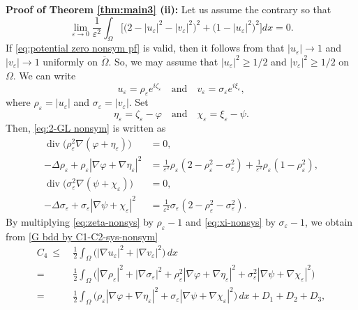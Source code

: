 \documentclass[a4paper,10pt,reqno]{amsart}
\theoremstyle{definition}
\newcommand{\ve}{{\varepsilon}}
\newcommand{\Om}{{\Omega}}
\newcommand{\qand}{{\quad \mbox{and} \quad}}
\numberwithin{equation}{section}
\begin{document}
 \smallskip
{\bf Proof of Theorem \ref{thm:main3} (ii): }
Let us assume the contrary so that
\begin{equation}\label{eq:potential zero nonsym pf}
\lim_{\ve \to 0} \frac{1}{\ve^2}  \int_\Om  \Big[ \big( 2- |u_\ve|^2 - |v_\ve|^2 \big)^2 +    \big( 1- |u_\ve|^2   \big)^2 \Big] dx = 0.
\end{equation}
If \eqref{eq:potential zero nonsym pf} is valid, then it follows from \cite[Lemma 2.5]{HHS-nonsym-deg-0} that $|u_\ve|\to 1$ and $|v_\ve|\to 1$ uniformly on $\overline\Om$.
So, we may assume that $|u_\ve|^2 \ge 1/2$ and $|v_\ve|^2 \ge 1/2$ on $\Om$.
We can write
\begin{equation}\label{eq:zeta xi}
 u_\varepsilon = \rho_\varepsilon e^{i \zeta_\varepsilon} \qand
v_\varepsilon = \sigma_\varepsilon e^{i \xi_\varepsilon},
\end{equation}
where $\rho_\ve = |u_\ve|$ and $\sigma_\ve = |v_\ve|$.
Set
\begin{equation}\label{eq:eta chi}
\eta_\varepsilon = \zeta_\varepsilon   -\varphi \qand \chi_\varepsilon = \xi_\varepsilon - \psi.
\end{equation}
Then, \eqref{eq:2-GL nonsym} is written as
\begin{align}
\label{eq:rho-nonsys}
\operatorname{div} \big(\rho_\varepsilon^2 \nabla( \varphi+\eta_\varepsilon )\big) &= 0,  \\
\label{eq:zeta-nonsys}
-\Delta \rho_\varepsilon + \rho_\varepsilon | \nabla \varphi + \nabla \eta_\varepsilon |^2
&= \frac{1}{\varepsilon^2}\rho_\varepsilon \left( 2 -  \rho_\varepsilon^2  - \sigma_\varepsilon^2\right) + \frac{1}{\varepsilon^2}\rho_\varepsilon \left( 1 -   \rho_\varepsilon^2 \right),\\
\label{eq:sigma-nonsys}
\operatorname{div}\big(\sigma_\varepsilon^2 \nabla( \psi+\chi_\varepsilon )\big) &= 0, \\
\label{eq:xi-nonsys}
-\Delta \sigma_\varepsilon + \sigma_\varepsilon |  \nabla \psi+\chi_\varepsilon |^2
&= \frac{1}{\varepsilon^2}\sigma_\varepsilon \left( 2 -  \rho_\varepsilon^2  - \sigma_\varepsilon^2\right) .
\end{align}
By multiplying \eqref{eq:zeta-nonsys} by $\rho_\ve-1$ and \eqref{eq:xi-nonsys} by $\sigma_\ve-1$, we obtain from \eqref{G bdd by C1-C2-sys-nonsym}
\begin{align*}
C_4 ~ \le ~& \frac12 \int_\Om \big( |\nabla u_\ve|^2 + |\nabla v_\ve|^2 \big) \, dx \\
=~ &
\frac{1}{2}\int_\Omega
\Big(
|\nabla \rho_\varepsilon|^2 + |\nabla \sigma_\varepsilon|^2
+ \rho_\varepsilon^2 | \nabla \varphi+\nabla \eta_\varepsilon |^2
+ \sigma_\varepsilon^2 | \nabla \psi+\nabla \chi_\varepsilon |^2
\Big)  \\
= ~& \frac12 \int_\Omega  \Big( \rho_\varepsilon  | \nabla \varphi+\nabla \eta_\varepsilon|^2
+ \sigma_\varepsilon  | \nabla \psi+\nabla \chi_\varepsilon |^2\Big) \, dx + D_1+D_2+D_3,
\end{align*}
\end{document}
